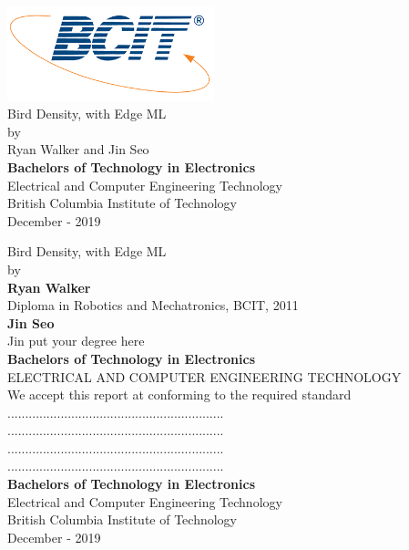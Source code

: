 \documentclass{article}
\begin{document}
\begin{center}
\includegraphics[width=6cm]{img/bcit-logo.png} \\
\huge{Bird Density, with Edge ML} \\
\large{by} \\
\large{Ryan Walker and Jin Seo} \\
\vspace*{\fill}
\large{\textbf{Bachelors of Technology in Electronics}} \\
\large{Electrical and Computer Engineering Technology} \\
\large{British Columbia Institute of Technology} \\
\large{December - 2019} \\
\end{center}
\newpage
\begin{center}
\huge{Bird Density, with Edge ML} \\
\large{by} \\

\large{\textbf{Ryan Walker}} \\
\large{Diploma in Robotics and Mechatronics, BCIT, 2011} \\
 
\large{\textbf{Jin Seo}} \\
\large{Jin put your degree here} \\
\vfill
\large{\textbf{Bachelors of Technology in Electronics}} \\
\large{ELECTRICAL AND COMPUTER ENGINEERING TECHNOLOGY} \\

\vfill
\large{We accept this report at conforming to the required standard} \\
\large{.............................................................} \\
\large{.............................................................} \\
\large{.............................................................} \\
\large{.............................................................} \\


\vspace*{\fill}
\large{\textbf{Bachelors of Technology in Electronics}} \\
\large{Electrical and Computer Engineering Technology} \\
\large{British Columbia Institute of Technology} \\
\large{December - 2019} \\
\end{center}
\newpage
\end{document}
